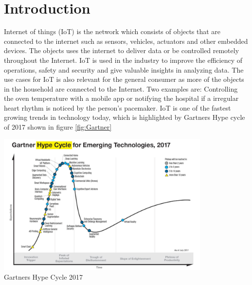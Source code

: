 
\chapter{Introduction}



Internet of things (IoT) is the network which consists of objects that are connected to the internet such as sensors, vehicles, actuators and other embedded devices. The objects uses the internet to deliver data or be controlled remotely throughout the Internet. IoT is used in the industry to improve the efficiency of operations, safety and security and give valuable insights in analyzing data. The use cases for IoT is also relevant for the general consumer as more of the objects in the household are connected to the Internet. Two examples are: Controlling the oven temperature with a mobile app or notifying the hospital if a irregular heart rhythm is noticed by the person's pacemaker. IoT is one of the fastest growing trends in technology today, which is highlighted by Gartners Hype cycle of 2017 shown in figure \ref{fig:Gartner}\\


\begin{minipage}[t]{0.8\textwidth}
    \centering
    \includegraphics[width=0.8\textwidth]{Images/Gartner.PNG}\\
    \caption{Gartners Hype Cycle 2017}
    \label{fig:Gartner}
\end{minipage}
\\



